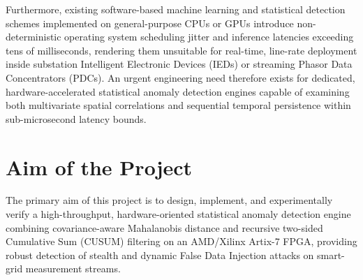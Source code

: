 \documentclass[12pt,a4paper]{report}
\begin{document}
Furthermore, existing software-based machine learning and statistical detection
schemes implemented on general-purpose CPUs or GPUs introduce non-deterministic
operating system scheduling jitter and inference latencies exceeding tens of
milliseconds, rendering them unsuitable for real-time, line-rate deployment inside
substation Intelligent Electronic Devices (IEDs) or streaming Phasor Data Concentrators
(PDCs). An urgent engineering need therefore exists for dedicated, hardware-accelerated
statistical anomaly detection engines capable of examining both multivariate spatial
correlations and sequential temporal persistence within sub-microsecond latency bounds.

\section{Aim of the Project}
The primary aim of this project is to design, implement, and experimentally verify
a high-throughput, hardware-oriented statistical anomaly detection engine combining
covariance-aware Mahalanobis distance and recursive two-sided Cumulative Sum (CUSUM)
filtering on an AMD/Xilinx Artix-7 FPGA, providing robust detection of stealth and
dynamic False Data Injection attacks on smart-grid measurement streams.
\end{document}
